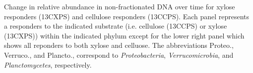 Change in relative abundance in non-fractionated DNA over time for xylose
responders (13CXPS) and cellulose responders (13CCPS). Each panel represents
a responders to the indicated substrate (i.e. cellulose (13CCPS) or xylose (13CXPS)) 
within the indicated phylum except for the lower right panel which shows all reponders to both
xylose and celluose. The abbreviations Proteo., Verruco., and Plancto.,
correspond to \textit{Proteobacteria}, \textit{Verrucomicrobia}, and \textit{Planctomycetes},
respectively.

